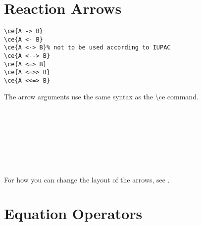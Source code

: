 \documentclass[a4paper,notitlepage,parskip=half]{scrreprt}
\newcommand\macro[1]{\mbox{\ttfamily\textbackslash#1}}
\begin{document}
\section{Reaction Arrows}

\verb|\ce{A -> B}|\\
\verb|\ce{A <- B}|\\
\verb|\ce{A <-> B}% not to be used according to IUPAC|\\ %
\verb|\ce{A <--> B}|\\
\verb|\ce{A <=> B}|\\
\verb|\ce{A <=>> B}|\\
\verb|\ce{A <<=> B}|

The arrow arguments use the same syntax as the \macro{ce} command.

\begin{SideBySideExample}[xrightmargin=3cm]
  \\%
  \sffamily\bfseries
\end{SideBySideExample}

\begin{SideBySideExample}[xrightmargin=3cm]
  \\%
  \sffamily\bfseries
\end{SideBySideExample}

\begin{SideBySideExample}[xrightmargin=3cm]
  \\%
  \sffamily\bfseries
\end{SideBySideExample}

\begin{SideBySideExample}[xrightmargin=3cm]
  \\%
  \sffamily\bfseries
\end{SideBySideExample}

For how you can change the layout of the arrows, see .


\section{Equation Operators}
\end{document}
